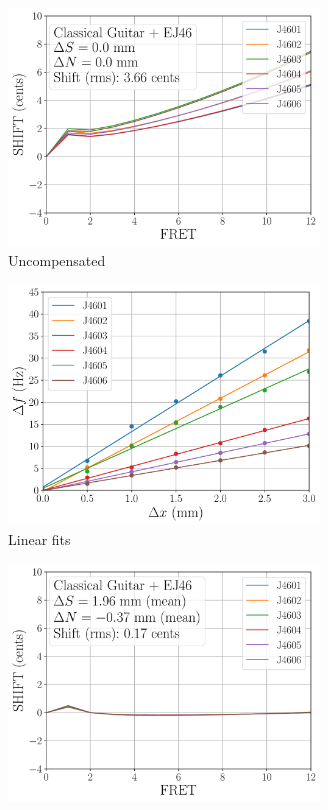  \begin{figure}
  \centering
  \begin{subfigure}[b]{0.45\textwidth}
   \centering
   \includegraphics[width=3.25in]{../figures/shift_classicalguitar_ej46_null}
   \caption{Uncompensated}
   \label{fig:shift_classicalguitar_ej46_null}
  \end{subfigure}
  \hspace{0.25in}
  \begin{subfigure}[b]{0.45\textwidth}
   \centering
   \includegraphics[width=3.25in]{../figures/fit_ej46}
   \caption{Linear fits}
   \label{fig:fit_ej46}
  \end{subfigure}
  \par\vspace{0.25in}
  \begin{subfigure}[b]{0.45\textwidth}
   \centering
   \includegraphics[width=3.25in]{../figures/shift_classicalguitar_ej46_full}

\end{subfigure}
\end{figure}
